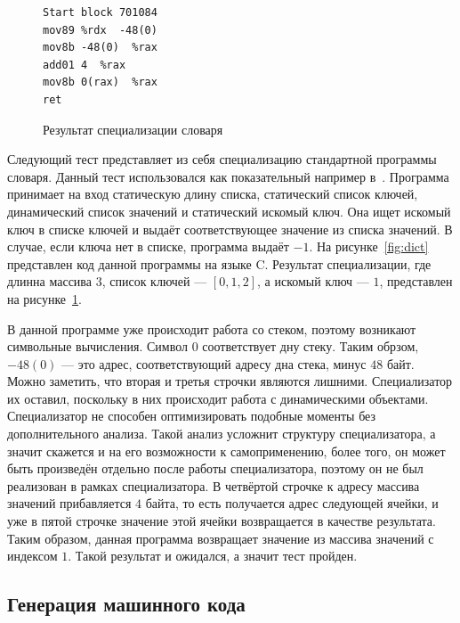 \begin{figure}
\begin{lstlisting}[xleftmargin = 20pt]
Start block 701084
mov89 %rdx  -48(0) 
mov8b -48(0)  %rax 
add01 4  %rax 
mov8b 0(rax)  %rax 
ret
\end{lstlisting}
\caption{Результат специализации словаря}
\label{fig:dictres}
\end{figure}
Следующий тест представляет из себя специализацию стандартной программы словаря.
Данный тест использовался как показательный например в~\cite{PEAPG}.
Программа принимает на вход статическую длину списка, статический список ключей, динамический список значений и статический искомый ключ.
Она ищет искомый ключ в списке ключей и выдаёт соответствующее значение из списка значений. В случае, если ключа нет в списке, программа выдаёт $-1$. На рисунке~\ref{fig:dict} представлен код данной программы на языке \textsf{C}.
Результат специализации, где длинна массива $3$, список ключей --- $[0, 1, 2]$, а искомый ключ --- $1$, представлен на рисунке~\ref{fig:dictres}.

В данной программе уже происходит работа со стеком, поэтому возникают символьные вычисления.
Символ $0$ соответствует дну стеку.
Таким обрзом, $-48(0)$ --- это адрес, соответствующий адресу дна стека, минус $48$ байт. Можно заметить, что вторая и третья строчки являются лишними. Специализатор их оставил, поскольку в них происходит работа с динамическими объектами.
Специализатор не способен оптимизировать подобные моменты без дополнительного анализа.
Такой анализ усложнит структуру специализатора, а значит скажется и на его возможности к самоприменению, более того,
он может быть произведён отдельно после работы специализатора, поэтому он не был реализован в рамках специализатора.
В четвёртой строчке к адресу массива значений прибавляется $4$ байта, то есть получается адрес следующей ячейки, и уже в пятой строчке значение этой ячейки возвращается в качестве результата. Таким образом, данная программа возвращает значение из массива значений с индексом $1$. Такой результат и ожидался, а значит тест пройден.


\subsection{ Генерация машинного кода}


